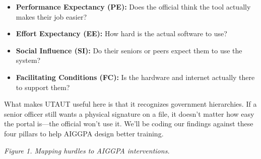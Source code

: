 \documentclass[11pt,a4paper]{article}
\begin{document}
\begin{itemize}
  \item \textbf{Performance Expectancy (PE):} Does the official think the tool 
    actually makes their job easier?
  \item \textbf{Effort Expectancy (EE):} How hard is the actual software to use?
  \item \textbf{Social Influence (SI):} Do their seniors or peers expect them 
    to use the system?
  \item \textbf{Facilitating Conditions (FC):} Is the hardware and 
    internet actually there to support them?
\end{itemize}

What makes UTAUT useful here is that it recognizes government hierarchies. 
If a senior officer still wants a physical signature on a file, it doesn't 
matter how easy the portal is—the official won't use it. We'll be coding 
our findings against these four pillars to help AIGGPA design better training.

\vspace{0.5cm}

\begin{center}
\end{center}

\vspace{0.2cm}
\begin{center}
\small\textit{Figure 1. Mapping hurdles to AIGGPA interventions.}
\end{center}
\end{document}
